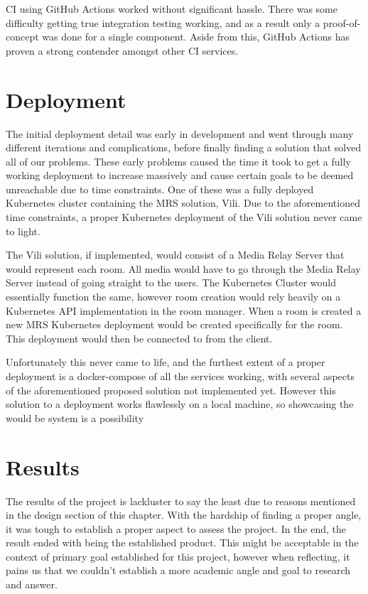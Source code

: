 CI using GitHub Actions worked without significant hassle. There was some difficulty getting true integration testing working, and as a result only a proof-of-concept was done for a single component. Aside from this, GitHub Actions has proven a strong contender amongst other CI services.

\section{Deployment}
The initial deployment detail was early in development and went through many different iterations and complications, before finally finding a solution that solved all of our problems. These early problems caused the time it took to get a fully working deployment to increase massively and cause certain goals to be deemed unreachable due to time constraints. One of these was a fully deployed Kubernetes cluster containing the MRS solution, Vili. Due to the aforementioned time constraints, a proper Kubernetes deployment of the Vili solution never came to light. 

The Vili solution, if implemented, would consist of a Media Relay Server that would represent each room. All media would have to go through the Media Relay Server instead of going straight to the users. The Kubernetes Cluster would essentially function the same, however room creation would rely heavily on a Kubernetes API implementation in the room manager. When a room is created a new MRS Kubernetes deployment would be created specifically for the room. This deployment would then be connected to from the client.

Unfortunately this never came to life, and the furthest extent of a proper deployment is a docker-compose of all the services working, with several aspects of the aforementioned proposed solution not implemented yet. However this solution to a deployment works flawlessly on a local machine, so showcasing the would be system is a possibility

\section{Results}

The results of the project is lackluster to say the least due to reasons mentioned in the design section of this chapter. With the hardship of finding a proper angle, it was tough to establish a proper aspect to assess the project. In the end, the result ended with being the established product. This might be acceptable in the context of primary goal established for this project, however when reflecting, it pains us that we couldn't establish a more academic angle and goal to research and answer. 

